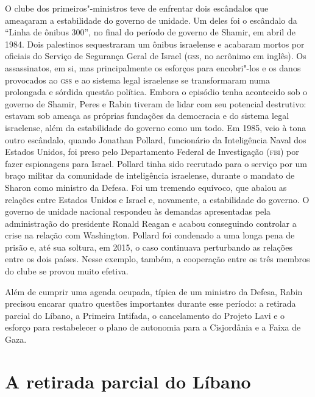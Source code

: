O clube dos primeiros"-ministros teve de enfrentar dois escândalos que
ameaçaram a estabilidade do governo de unidade. Um deles foi o escândalo
da ``Linha de ônibus 300'', no final do período de governo de Shamir, em
abril de 1984. Dois palestinos sequestraram um ônibus israelense e
acabaram mortos por oficiais do Serviço de Segurança Geral de Israel (\textsc{gss}, no
acrônimo em inglês). Os assassinatos, em si, mas principalmente os esforços
para encobri"-los e os danos provocados ao \textsc{gss} e ao sistema legal
israelense se transformaram numa prolongada e sórdida questão política.
Embora o episódio tenha acontecido sob o governo de Shamir, Peres e
Rabin tiveram de lidar com seu potencial destrutivo: estavam sob ameaça
as próprias fundações da democracia e do sistema legal israelense, além
da estabilidade do governo como um todo. Em 1985, veio à tona outro
escândalo, quando Jonathan Pollard, funcionário da Inteligência Naval
dos Estados Unidos, foi preso pelo Departamento Federal de Investigação (\textsc{fbi}) por fazer espionagens para
Israel. Pollard tinha sido recrutado para o serviço por um braço militar
da comunidade de inteligência israelense, durante o mandato de Sharon
como ministro da Defesa. Foi um tremendo equívoco, que abalou as
relações entre Estados Unidos e Israel e, novamente, a estabilidade do
governo. O governo de unidade nacional respondeu às demandas
apresentadas pela administração do presidente Ronald Reagan e acabou
conseguindo controlar a crise na relação com Washington. Pollard foi
condenado a uma longa pena de prisão e, até sua soltura, em 2015, o caso
continuava perturbando as relações entre os dois países. Nesse exemplo,
também, a cooperação entre os três membros do clube se provou muito
efetiva.

Além de cumprir uma agenda ocupada, típica de um ministro da Defesa,
Rabin precisou encarar quatro questões importantes durante esse período:
a retirada parcial do Líbano, a Primeira Intifada, o cancelamento do
Projeto Lavi e o esforço para restabelecer o plano de autonomia para a
Cisjordânia e a Faixa de Gaza.

\section{A retirada parcial do Líbano}

